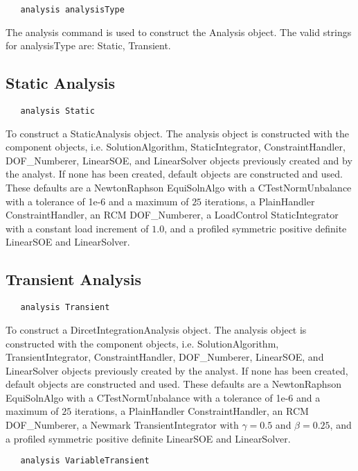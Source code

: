 \documentclass[12pt]{article}
\begin{document}
{\sf\small
\begin{verbatim}
   analysis analysisType 
\end{verbatim}
}

The analysis command is used to construct the Analysis object.
The valid strings for analysisType are: Static, Transient. 

\subsection{Static Analysis}

{\sf\small
\begin{verbatim}
   analysis Static 
\end{verbatim}
}

To construct a StaticAnalysis object. The analysis object is
constructed with the component objects, i.e. SolutionAlgorithm, StaticIntegrator,
ConstraintHandler, DOF\_Numberer, LinearSOE, and LinearSolver objects
previously created and by the analyst. If none has been created,
default objects are constructed and used. These defaults are a
NewtonRaphson EquiSolnAlgo with a CTestNormUnbalance with a tolerance
of 1e-6 and a maximum of $25$ iterations, a PlainHandler
ConstraintHandler, an RCM DOF\_Numberer, a LoadControl
StaticIntegrator with a constant load increment of $1.0$, and a
profiled symmetric positive definite LinearSOE and LinearSolver.

\subsection{Transient Analysis}

{\sf\small
\begin{verbatim}
   analysis Transient
\end{verbatim}
}

To construct a DircetIntegrationAnalysis object. The analysis object is
constructed with the component objects, i.e. SolutionAlgorithm,
TransientIntegrator, ConstraintHandler, DOF\_Numberer, LinearSOE, and
LinearSolver objects previously created by the analyst. If none has been  
created, default objects are constructed and used. These defaults are
a NewtonRaphson EquiSolnAlgo with a CTestNormUnbalance with a
tolerance of 1e-6 and a maximum of $25$ iterations, a PlainHandler
ConstraintHandler, an RCM DOF\_Numberer, a Newmark
TransientIntegrator with $\gamma = 0.5$ and $\beta = 0.25$, and a profiled
symmetric positive definite LinearSOE and LinearSolver.


{\sf\small
\begin{verbatim}
   analysis VariableTransient
\end{verbatim}
}
\end{document}
